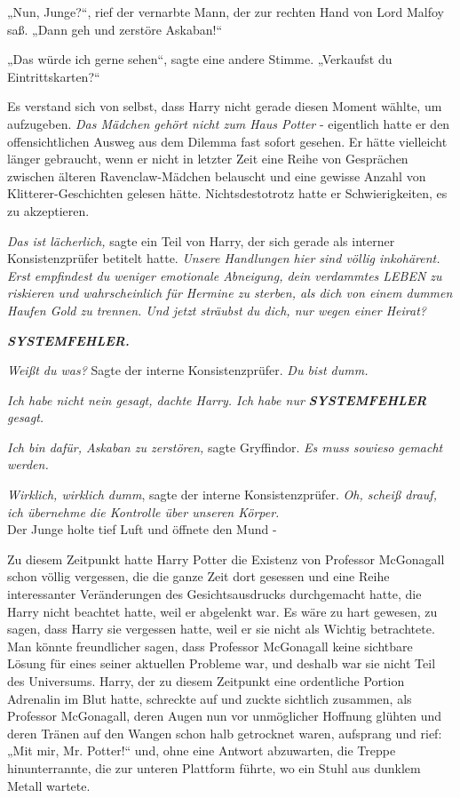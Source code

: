 {„Nun, Junge?“, rief der vernarbte Mann, der zur rechten Hand von Lord Malfoy saß. „Dann geh und zerstöre Askaban!“

„Das würde ich gerne sehen“, sagte eine andere Stimme. „Verkaufst du Eintrittskarten?“

Es verstand sich von selbst, dass Harry nicht gerade diesen Moment wählte, um aufzugeben. \emph{Das Mädchen gehört nicht zum Haus Potter} - eigentlich hatte er den offensichtlichen Ausweg aus dem Dilemma fast sofort gesehen. Er hätte vielleicht länger gebraucht, wenn er nicht in letzter Zeit eine Reihe von Gesprächen zwischen älteren Ravenclaw-Mädchen belauscht und eine gewisse Anzahl von Klitterer-Geschichten gelesen hätte. Nichtsdestotrotz hatte er Schwierigkeiten, es zu akzeptieren.

\emph{Das ist lächerlich,} sagte ein Teil von Harry, der sich gerade als interner Konsistenzprüfer betitelt hatte. \emph{Unsere Handlungen hier sind völlig inkohärent. Erst empfindest du weniger emotionale Abneigung, dein verdammtes LEBEN zu riskieren und wahrscheinlich für Hermine zu sterben, als dich von einem dummen Haufen Gold zu trennen. Und jetzt sträubst du dich, nur wegen einer Heirat?}

\textbf{\emph{SYSTEMFEHLER.}}

\emph{Weißt du was?} Sagte der interne Konsistenzprüfer. \emph{Du bist dumm.}

\emph{Ich habe nicht nein gesagt, dachte Harry. Ich habe nur} \textbf{\emph{SYSTEMFEHLER}} \emph{gesagt.}

\emph{Ich bin dafür, Askaban zu zerstören,} sagte Gryffindor. \emph{Es muss sowieso gemacht werden.}

\emph{Wirklich, wirklich dumm}, sagte der interne Konsistenzprüfer. \emph{Oh, scheiß drauf, ich übernehme die Kontrolle über unseren Körper.}\\ Der Junge holte tief Luft und öffnete den Mund -

Zu diesem Zeitpunkt hatte Harry Potter die Existenz von Professor McGonagall schon völlig vergessen, die die ganze Zeit dort gesessen und eine Reihe interessanter Veränderungen des Gesichtsausdrucks durchgemacht hatte, die Harry nicht beachtet hatte, weil er abgelenkt war. Es wäre zu hart gewesen, zu sagen, dass Harry sie vergessen hatte, weil er sie nicht als Wichtig betrachtete. Man könnte freundlicher sagen, dass Professor McGonagall keine sichtbare Lösung für eines seiner aktuellen Probleme war, und deshalb war sie nicht Teil des Universums. Harry, der zu diesem Zeitpunkt eine ordentliche Portion Adrenalin im Blut hatte, schreckte auf und zuckte sichtlich zusammen, als Professor McGonagall, deren Augen nun vor unmöglicher Hoffnung glühten und deren Tränen auf den Wangen schon halb getrocknet waren, aufsprang und rief: „Mit mir, Mr. Potter!“ und, ohne eine Antwort abzuwarten, die Treppe hinunterrannte, die zur unteren Plattform führte, wo ein Stuhl aus dunklem Metall wartete.

}
